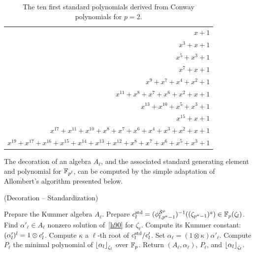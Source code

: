 \documentclass{sig-alternate}
\begin{document}
\begin{table}[h]
  \centering
  \small
  \begin{tabular}[h]{r}
    $x+1$\\
    $x^3+x+1$\\
    $x^5+x^3+1$\\
    $x^7+x+1$\\
    $x^9+x^7+x^4+x^2+1$   \\
    $x^{11}+x^8+x^7+x^6+x^2+x+1$\\
    $x^{13}+x^{10}+x^5+x^3+1$\\
    $x^{15}+x+1$ \\
    \tiny
    $x^{17}+x^{11}+x^{10}+x^8+ x^7+x^6+x^4+x^3+x^2+x+1$ \\
    \tiny
    $x^{19}+x^{17}+x^{16}+x^{15}+x^{14}+x^{13}+x^{12}+x^8+x^7+x^6+x^5+x^3+1$
  \end{tabular}
  
  \caption{The ten first standard polynomials derived from Conway
    polynomials for $p=2$.}
  \label{tab:std-polys}
\end{table}


The decoration of an algebra $A_\ell$, and the associated standard
generating element and polynomial for $\mathbb{F}_{p^l}$, can be computed by the simple adaptation of
Allombert's algorithm presented below. %

\begin{algorithm}
  \caption{(Decoration -- Standardization)}
  \label{algo:decoration}
  \begin{algorithmic}[1]
  \STATE Prepare the Kummer algebra $A_\ell$.
  \STATE Prepare $c^{\mathrm{std}}_l=({\phi^{\mathcal{S}^\mu}_{{l},{p^a-1}}})^{-1}((\zeta_{p^a-1})^a)\in\mathbb{F}_p(\zeta_l)$.
  \STATE Find $\alpha'_\ell\in A_\ell$ nonzero solution of~\eqref{h90} for $\zeta_\ell$.
  \STATE Compute its Kummer constant: $(\alpha'_l)^l=1\otimes c'_l$.
  \STATE Compute $\kappa$ a $\ell$-th root of $c^{\mathrm{std}}_l/c'_l$.
  \STATE Set $\alpha_{\ell}=(1\otimes\kappa)\alpha'_\ell$.
  \STATE Compute $P_\ell$ the minimal polynomial of $\left\lfloor \alpha_{l} \right\rfloor_{\zeta_l}$ over $\mathbb{F}_{p}$.
  \STATE Return $(A_\ell,\alpha_\ell)$, $P_\ell$, and $\left\lfloor \alpha_l \right\rfloor_{\zeta_l}$.
  \end{algorithmic}
\end{algorithm}
\end{document}
